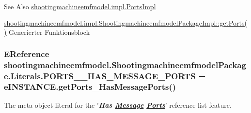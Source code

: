 \begin{DoxySeeAlso}{See Also}
\hyperlink{classshootingmachineemfmodel_1_1impl_1_1_ports_impl}{shootingmachineemfmodel.\-impl.\-Ports\-Impl} 

\hyperlink{classshootingmachineemfmodel_1_1impl_1_1_shootingmachineemfmodel_package_impl_ab434e3a5bfcdf490bed77881dae0841e}{shootingmachineemfmodel.\-impl.\-Shootingmachineemfmodel\-Package\-Impl\-::get\-Ports()} Generierter Funktionsblock 
\end{DoxySeeAlso}
\hypertarget{interfaceshootingmachineemfmodel_1_1_shootingmachineemfmodel_package_1_1_literals_af1aad2cd07c3bdb92ac4925b82c06d86}{
\subsubsection[{P\-O\-R\-T\-S\-\_\-\-\_\-\-H\-A\-S\-\_\-\-M\-E\-S\-S\-A\-G\-E\-\_\-\-P\-O\-R\-T\-S}]{\setlength{\rightskip}{0pt plus 5cm}E\-Reference shootingmachineemfmodel.\-Shootingmachineemfmodel\-Package.\-Literals.\-P\-O\-R\-T\-S\-\_\-\-\_\-\-H\-A\-S\-\_\-\-M\-E\-S\-S\-A\-G\-E\-\_\-\-P\-O\-R\-T\-S = e\-I\-N\-S\-T\-A\-N\-C\-E.\-get\-Ports\-\_\-\-Has\-Message\-Ports()}}\label{interfaceshootingmachineemfmodel_1_1_shootingmachineemfmodel_package_1_1_literals_af1aad2cd07c3bdb92ac4925b82c06d86}
The meta object literal for the '{\itshape {\bfseries Has \hyperlink{interfaceshootingmachineemfmodel_1_1_message}{Message} \hyperlink{interfaceshootingmachineemfmodel_1_1_ports}{Ports}}}' reference list feature.

